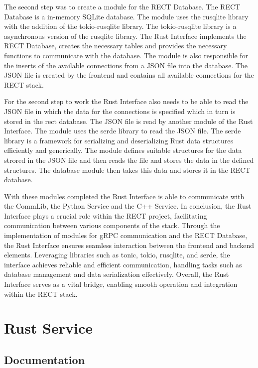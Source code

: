 The second step was to create a module for the RECT Database. The RECT Database is a in-memory SQLite database. The module uses the rusqlite library with the addition of
the tokio-rusqlite library. The tokio-rusqlite library is a asynchronous version of the rusqlite library. The Rust Interface implements the RECT Database, creates the 
necessary tables and provides the necessary functions to communicate with the database. The module is also responsible for the inserts of the available connections from a
JSON file into the database. The JSON file is created by the frontend and contains all available connections for the RECT stack.\newline

For the second step to work the Rust Interface also needs to be able to read the JSON file in which the data for the connections is specified which in turn is stored in the rect database. The JSON file is read by another module of the Rust Interface. The module uses
the serde library to read the JSON file. The serde library is a framework for serializing and deserializing Rust data structures efficiently and generically. The module 
defines suitable structures for the data strored in the JSON file and then reads the file and stores the data in the defined structures. The database module then takes
this data and stores it in the RECT database.\newline

With these modules completed the Rust Interface is able to communicate with the CommLib, the Python Service and the C++ Service. In conclusion, the Rust Interface plays a 
crucial role within the RECT project, facilitating communication between various components of the stack. Through the implementation of modules for gRPC communication and 
the RECT Database, the Rust Interface ensures seamless interaction between the frontend and backend elements. Leveraging libraries such as tonic, tokio, rusqlite, and 
serde, the interface achieves reliable and efficient communication, handling tasks such as database management and data serialization effectively. Overall, the Rust 
Interface serves as a vital bridge, enabling smooth operation and integration within the RECT stack.

\section{Rust Service}
\subsection{Documentation}

